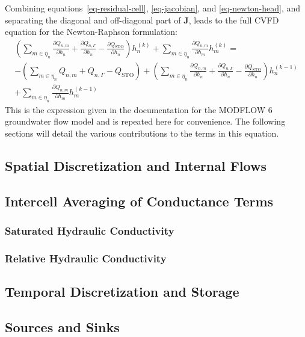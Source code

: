 \documentclass[fleqn]{article}
\begin{document}
Combining equations~\ref{eq-residual-cell}, \ref{eq-jacobian},
and \ref{eq-newton-head}, and separating the diagonal and
off-diagonal part of $\mathbf{J}$, leads to the full CVFD
equation for the Newton-Raphson formulation:
\begin{equation}
\begin{split}
  \left(
    \sum_{m \in \eta_n} 
      \frac{\partial Q_{n,m}}{\partial h_n} + 
      \frac{\partial Q_{n, \Gamma}}{\partial h_n} - 
      \frac{\partial Q_{\textrm{STO}}}{\partial h_n}
  \right) 
  h_n^{(k)} +
  \sum_{m \in \eta_n} \frac{\partial Q_{n,m}}{\partial h_m} 
  h_m^{(k)} =\\
  - 
  \left(
    \sum_{m \in \eta_n} Q_{n,m} + 
    Q_{n, \Gamma} - 
    Q_{\textrm{STO}}
  \right) +
  \left(
    \sum_{m \in \eta_n} 
      \frac{\partial Q_{n,m}}{\partial h_n} + 
      \frac{\partial Q_{n, \Gamma}}{\partial h_n} - 
      \frac{\partial Q_{\textrm{STO}}}{\partial h_n}
  \right) 
  h_n^{(k-1)}\\
  + \sum_{m \in \eta_n} \frac{\partial Q_{n,m}}{\partial h_m} 
  h_m^{(k-1)}
\end{split}
\end{equation}
This is the expression given in the documentation for the MODFLOW 6 
groundwater flow model and is repeated here for convenience.
The following sections will detail the various contributions to the
terms in this equation.

\subsection{Spatial Discretization and Internal Flows}
\subsection{Intercell Averaging of Conductance Terms}\label{sec-cond-avg}
\subsubsection*{Saturated Hydraulic Conductivity}
\subsubsection*{Relative Hydraulic Conductivity}
\subsection{Temporal Discretization and Storage}
\subsection{Sources and Sinks}
\end{document}
